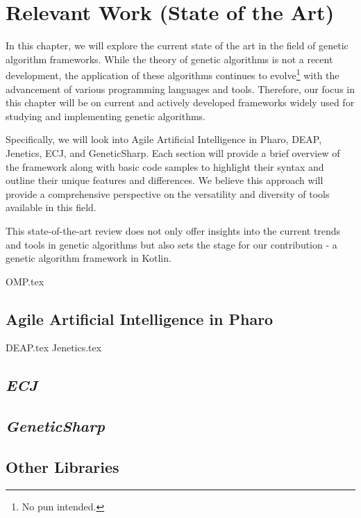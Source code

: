 \chapter{Relevant Work (State of the Art)}
\label{chap:sota}

  In this chapter, we will explore the current state of the art in the field of
  genetic algorithm frameworks.
  While the theory of genetic algorithms is not a recent development, the
  application of these algorithms continues to evolve\footnote{No pun intended.}
  with the advancement of various programming languages and tools.
  Therefore, our focus in this chapter will be on current and actively developed
  frameworks widely used for studying and implementing genetic algorithms.

  Specifically, we will look into Agile Artificial Intelligence in Pharo, DEAP,
  Jenetics, ECJ, and GeneticSharp.
  Each section will provide a brief overview of the framework along with basic
  code samples to highlight their syntax and outline their unique features and
  differences.
  We believe this approach will provide a comprehensive perspective on the
  versatility and diversity of tools available in this field.

  This state-of-the-art review does not only offer insights into the current
  trends and tools in genetic algorithms but also sets the stage for our
  contribution - a genetic algorithm framework in Kotlin.

  {OMP.tex}
  
  \section{Agile Artificial Intelligence in Pharo}
  \label{sec:sota:pharo}
    \Blindtext

  {DEAP.tex}
  {Jenetics.tex}
  
  \section{\textit{ECJ}}
  \label{sec:sota:ecj}
    \Blindtext
  \section{\textit{GeneticSharp}}
  \label{sec:sota:geneticsharp}
    \Blindtext
  \section{Other Libraries}
  \label{sec:sota:other}
    \Blindtext
